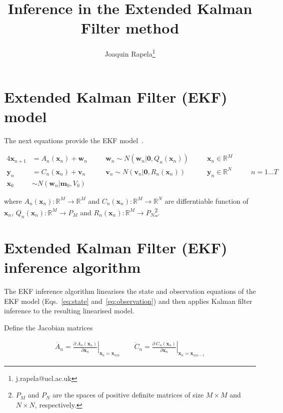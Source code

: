 \documentclass[12pt]{article}
\title{Inference in the Extended Kalman Filter method}
\author{Joaquin Rapela\thanks{j.rapela@ucl.ac.uk}}
\begin{document}
\maketitle

\section{Extended Kalman Filter (EKF) model}
\label{sec:ekfModel}

The next equations provide the EKF
model~\citep[][Chapter~10]{durbinAndKoopman12}.

\begin{alignat}{4}
    \mathbf{x}_{n+1}&=A_n(\mathbf{x}_n)+\mathbf{w}_n\quad&&\mathbf{w}_n\sim N(\mathbf{w}_n|\mathbf{0},Q_n(\mathbf{x}_n))\quad&&\mathbf{x}_n\in\mathbb{R}^M&&\label{eq:state}\\
    \mathbf{y}_n&=C_n(\mathbf{x}_{n})+\mathbf{v}_n\quad&&\mathbf{v}_n\sim N(\mathbf{v}_n|\mathbf{0},R_n(\mathbf{x}_n))\quad&&\mathbf{y}_n\in\mathbb{R}^N&&\quad n=1\ldots T\label{eq:observation}\\
    \mathbf{x}_0&\sim N(\mathbf{w}_n|\mathbf{m}_0,V_0)&& &&\nonumber
\end{alignat}

\noindent where $A_n(\mathbf{x}_n):\mathbb{R}^M\rightarrow\mathbb{R}^M$ and
$C_n(\mathbf{x}_{n}):\mathbb{R}^M\rightarrow\mathbb{R}^N$ are differntiable
function of $\mathbf{x}_n$,
$Q_n(\mathbf{x}_n):\mathbb{R}^M\rightarrow P_M$ and
$R_n(\mathbf{x}_n):\mathbb{R}^M\rightarrow P_N$\footnote{$P_M$ and $P_N$ are
the spaces of positive definite matrices of size $M\times M$ and $N\times N$,
respectively.}.

\section{Extended Kalman Filter (EKF) inference algorithm}
\label{sec:ekfInference}

The EKF inference algorithm linearises the state and observation equations of
the EKF model (Eqs.~\ref{eq:state} and~\ref{eq:observation}) and then applies
Kalman filter inference to the resulting linearised model.

Define the Jacobian matrices

\begin{align*}
    \dot{A}_n=\left.\frac{\partial\ A_n(\mathbf{x}_n)}{\partial\mathbf{x}_n}\right|_{\mathbf{x}_n=\mathbf{x}_{n|n}}\qquad\dot{C}_n=\left.\frac{\partial\ C_n(\mathbf{x}_n)}{\partial\mathbf{x}_n}\right|_{\mathbf{x}_n=\mathbf{x}_{n|n-1}}
\end{align*}
\end{document}
